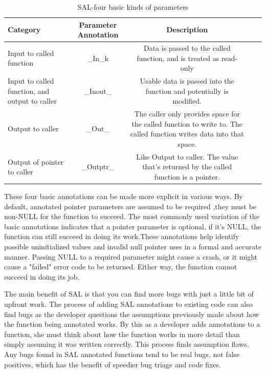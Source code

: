 \begin{table}
	\centering
	\begin{tabular}{l*{3}{c}r}
		\hline
		Category  & Parameter Annotation & Description  \\
		\hline
		
		Input to called function        & \_In\_k  		   & Data is passed to the called function, and is treated as read-only\\
		\hline
		
		Input to called function, and output to caller        & \_Inout\_ & Usable data is passed into the function and potentially is modified. \\ \hline
		Output to caller        & \_Out\_ & The caller only provides space for the called function to write to. The called function writes data into that space. \\
		\hline
		
		Output of pointer to caller         & \_Outptr\_  & Like Output to caller. The value that's returned by the called function is a pointer.\\ 	\hline
			
	\end{tabular}
	\caption{SAL-four basic kinds of parameters}
	\label{table:four basic kinds of parameters}
\end{table}

These four basic annotations can be made more explicit in various ways. By default, annotated pointer parameters are assumed to be required ,they must be non-NULL for the function to succeed. The most commonly used variation of the basic annotations indicates that a pointer parameter is optional, if it's NULL, the function can still succeed in doing its work.These annotations help identify possible uninitialized values and invalid null pointer uses in a formal and accurate manner. Passing NULL to a required parameter might cause a crash, or it might cause a "failed" error code to be returned. Either way, the function cannot succeed in doing its job.

The main benefit of SAL is that you can find more bugs with just a little bit of upfront work. The process of adding SAL annotations to existing code can also find bugs as the developer questions the assumptions previously made about how the function being annotated works. By this as a developer adds annotations to a function, she must think about how the function works in more detail than simply assuming it was written correctly. This process finds assumption flaws. Any bugs found in SAL annotated functions tend to be real bugs, not false positives, which has the benefit of speedier bug triage and code fixes.

